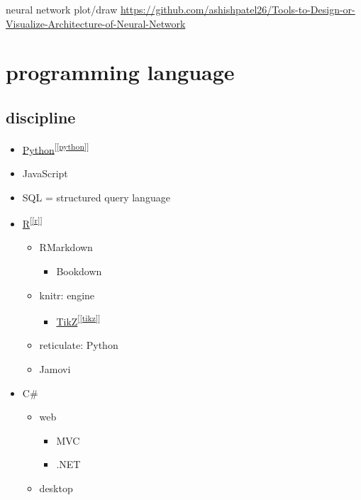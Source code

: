 \documentclass[
]{book}
\providecommand{\tightlist}{%
  \setlength{\itemsep}{0pt}\setlength{\parskip}{0pt}}
\theoremstyle{definition}
\theoremstyle{definition}
\theoremstyle{definition}
\theoremstyle{definition}
\theoremstyle{remark}
\begin{document}
neural network plot/draw
\url{https://github.com/ashishpatel26/Tools-to-Design-or-Visualize-Architecture-of-Neural-Network}

\hypertarget{programming-language}{%
\chapter{programming language}\label{programming-language}}

\hypertarget{discipline-2}{%
\section{discipline}\label{discipline-2}}

\begin{itemize}
\tightlist
\item
  \protect\hyperlink{python}{Python}\textsuperscript{{[}\ref{python}{]}}
\item
  JavaScript
\item
  SQL = structured query language
\item
  \protect\hyperlink{r}{R}\textsuperscript{{[}\ref{r}{]}}

  \begin{itemize}
  \tightlist
  \item
    RMarkdown

    \begin{itemize}
    \tightlist
    \item
      Bookdown
    \end{itemize}
  \item
    knitr: engine

    \begin{itemize}
    \tightlist
    \item
      \protect\hyperlink{tikz}{TikZ}\textsuperscript{{[}\ref{tikz}{]}}
    \end{itemize}
  \item
    reticulate: Python
  \item
    Jamovi
  \end{itemize}
\item
  C\#

  \begin{itemize}
  \tightlist
  \item
    web

    \begin{itemize}
    \tightlist
    \item
      MVC
    \item
      .NET
    \end{itemize}
  \item
    desktop


\end{itemize}
\end{itemize}
\end{document}

